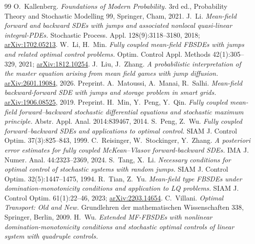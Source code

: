 \documentclass[preprint,12pt]{elsarticle}
\numberwithin{equation}{section}
\theoremstyle{plain}
\theoremstyle{definition}
\theoremstyle{\PaperRemarkStyle}
\begin{document}
\begin{thebibliography}{99}
 O.~Kallenberg.
  \emph{Foundations of Modern Probability.} 3rd ed., Probability Theory and Stochastic
  Modelling 99, Springer, Cham, 2021.
 J.~Li.
  \emph{Mean-field forward and backward SDEs with jumps and associated nonlocal
  quasi-linear integral-PDEs.} Stochastic Process. Appl. 128(9):3118--3180, 2018;
  \href{https://arxiv.org/abs/1702.05213}{arXiv:1702.05213}.
 W.~Li, H.~Min.
  \emph{Fully coupled mean-field FBSDEs with jumps and related optimal control
  problems.} Optim. Control Appl. Methods 42(1):305--329, 2021;
  \href{https://arxiv.org/abs/1812.10254}{arXiv:1812.10254}.
 J.~Liu, J.~Zhang.
  \emph{A probabilistic interpretation of the master equation arising from mean field
  games with jump diffusion.} \href{https://arxiv.org/abs/2601.19084}{arXiv:2601.19084},
  2026. Preprint.
 A.~Matoussi, A.~Manai, R.~Salhi.
  \emph{Mean-field backward-forward SDE with jumps and storage problem in smart grids.}
  \href{https://arxiv.org/abs/1906.08525}{arXiv:1906.08525}, 2019. Preprint.
 H.~Min, Y.~Peng, Y.~Qin.
  \emph{Fully coupled mean-field forward--backward stochastic differential equations
  and stochastic maximum principle.} Abstr. Appl. Anal. 2014:839467, 2014.
 S.~Peng, Z.~Wu.
  \emph{Fully coupled forward--backward SDEs and applications to optimal control.}
  SIAM J. Control Optim. 37(3):825--843, 1999.
 C.~Reisinger, W.~Stockinger, Y.~Zhang.
  \emph{A posteriori error estimates for fully coupled McKean--Vlasov forward-backward
  SDEs.} IMA J. Numer. Anal. 44:2323--2369, 2024.
 S.~Tang, X.~Li.
  \emph{Necessary conditions for optimal control of stochastic systems with random
  jumps.} SIAM J. Control Optim. 32(5):1447--1475, 1994.
 R.~Tian, Z.~Yu.
  \emph{Mean-field type FBSDEs under domination-monotonicity conditions and
  application to LQ problems.} SIAM J. Control Optim. 61(1):22--46, 2023;
  \href{https://arxiv.org/abs/2203.14654}{arXiv:2203.14654}.
 C.~Villani.
  \emph{Optimal Transport: Old and New.} Grundlehren der mathematischen
  Wissenschaften 338, Springer, Berlin, 2009.
 H.~Wu.
  \emph{Extended MF-FBSDEs with nonlinear domination-monotonicity conditions and stochastic
  optimal controls of linear system with quadruple controls.}

\end{thebibliography}
\end{document}

